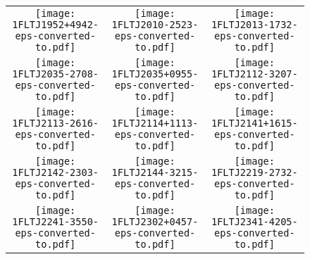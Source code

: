 \begin{figure}[!t]
	\centering            
	\ContinuedFloat 
\setlength\tabcolsep{0.0pt}
\begin{tabular}{ccc}
  \texttt{[image: 1FLTJ1952+4942-eps-converted-to.pdf]}\label{fig:1FLTJ1952+4942}&
  \texttt{[image: 1FLTJ2010-2523-eps-converted-to.pdf]}\label{fig:1FLTJ2010-2523}&
  \texttt{[image: 1FLTJ2013-1732-eps-converted-to.pdf]}\label{fig:1FLTJ2013-1732}\\
  \texttt{[image: 1FLTJ2035-2708-eps-converted-to.pdf]}\label{fig:1FLTJ2035-2708}&
  \texttt{[image: 1FLTJ2035+0955-eps-converted-to.pdf]}\label{fig:1FLTJ2035+0955}&
  \texttt{[image: 1FLTJ2112-3207-eps-converted-to.pdf]}\label{fig:1FLTJ2112-3207}\\
  \texttt{[image: 1FLTJ2113-2616-eps-converted-to.pdf]}\label{fig:1FLTJ2113-2616}&
  \texttt{[image: 1FLTJ2114+1113-eps-converted-to.pdf]}\label{fig:1FLTJ2114+1113}&
  \texttt{[image: 1FLTJ2141+1615-eps-converted-to.pdf]}\label{fig:1FLTJ2141+1615}\\
  \texttt{[image: 1FLTJ2142-2303-eps-converted-to.pdf]}\label{fig:1FLTJ2142-2303}&
  \texttt{[image: 1FLTJ2144-3215-eps-converted-to.pdf]}\label{fig:1FLTJ2144-3215}&
  \texttt{[image: 1FLTJ2219-2732-eps-converted-to.pdf]}\label{fig:1FLTJ2219-2732}\\
  \texttt{[image: 1FLTJ2241-3550-eps-converted-to.pdf]}\label{fig:1FLTJ2241-3550}&
  \texttt{[image: 1FLTJ2302+0457-eps-converted-to.pdf]}\label{fig:1FLTJ2302+0457}&
  \texttt{[image: 1FLTJ2341-4205-eps-converted-to.pdf]}\label{fig:1FLTJ2341-420}\\
\end{tabular}
\end{figure}